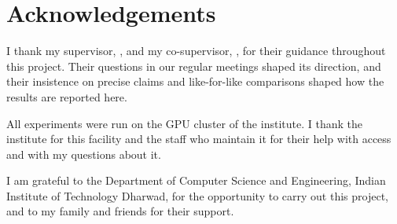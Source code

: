\chapter*{\centering Acknowledgements}
\onehalfspacing
I thank my supervisor, \the\guide, and my co-supervisor, \cosupervisor, for their guidance throughout this
project. Their questions in our regular meetings shaped its direction, and their insistence on precise claims and
like-for-like comparisons shaped how the results are reported here.

All experiments were run on the GPU cluster of the institute. I thank the institute for this facility and the
staff who maintain it for their help with access and with my questions about it.

I am grateful to the Department of Computer Science and Engineering, Indian Institute of Technology Dharwad, for
the opportunity to carry out this project, and to my family and friends for their support.
\raggedbottom
